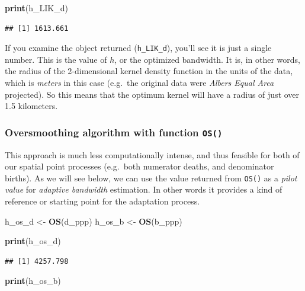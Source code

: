 \documentclass[
]{book}
\newenvironment{Shaded}{\begin{snugshade}}{\end{snugshade}}
\newcommand{\FunctionTok}[1]{\textcolor[rgb]{0.13,0.29,0.53}{\textbf{#1}}}
\newcommand{\NormalTok}[1]{#1}
\newcommand{\OtherTok}[1]{\textcolor[rgb]{0.56,0.35,0.01}{#1}}
\begin{document}
\begin{Shaded}
\begin{Highlighting}[]
\FunctionTok{print}\NormalTok{(h\_LIK\_d)}
\end{Highlighting}
\end{Shaded}

\begin{verbatim}
## [1] 1613.661
\end{verbatim}

If you examine the object returned (\texttt{h\_LIK\_d}), you'll see it is just a single number. This is the value of \(h\), or the optimized bandwidth. It is, in other words, the radius of the 2-dimensional kernel density function in the units of the data, which is \emph{meters} in this case (e.g.~the original data were \emph{Albers Equal Area} projected). So this means that the optimum kernel will have a radius of just over 1.5 kilometers.

\hypertarget{oversmoothing-algorithm-with-function-os}{%
\subsubsection{\texorpdfstring{Oversmoothing algorithm with function \texttt{OS()}}{Oversmoothing algorithm with function OS()}}\label{oversmoothing-algorithm-with-function-os}}

This approach is much less computationally intense, and thus feasible for both of our spatial point processes (e.g.~both numerator deaths, and denominator births). As we will see below, we can use the value returned from \texttt{OS()} as a \emph{pilot value} for \emph{adaptive bandwidth} estimation. In other words it provides a kind of reference or starting point for the adaptation process.

\begin{Shaded}
\begin{Highlighting}[]
\NormalTok{h\_os\_d }\OtherTok{\textless{}{-}} \FunctionTok{OS}\NormalTok{(d\_ppp)}
\NormalTok{h\_os\_b }\OtherTok{\textless{}{-}} \FunctionTok{OS}\NormalTok{(b\_ppp)}

\FunctionTok{print}\NormalTok{(h\_os\_d)}
\end{Highlighting}
\end{Shaded}

\begin{verbatim}
## [1] 4257.798
\end{verbatim}

\begin{Shaded}
\begin{Highlighting}[]
\FunctionTok{print}\NormalTok{(h\_os\_b)}
\end{Highlighting}
\end{Shaded}
\end{document}
